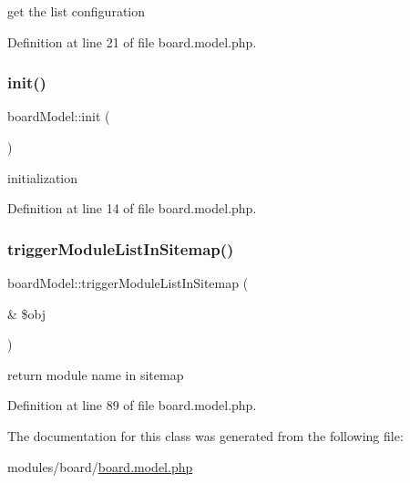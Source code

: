 get the list configuration 



Definition at line 21 of file board.\+model.\+php.

\hypertarget{classboardModel_a6195c2c2de16e5fee06e360aba66055a}{}\label{classboardModel_a6195c2c2de16e5fee06e360aba66055a} 
\subsubsection{\texorpdfstring{init()}{init()}}
{\footnotesize\ttfamily board\+Model\+::init (\begin{DoxyParamCaption}{ }\end{DoxyParamCaption})}



initialization 



Definition at line 14 of file board.\+model.\+php.

\hypertarget{classboardModel_a1960d5d832bbe3464065ec3c1ffce947}{}\label{classboardModel_a1960d5d832bbe3464065ec3c1ffce947} 
\subsubsection{\texorpdfstring{trigger\+Module\+List\+In\+Sitemap()}{triggerModuleListInSitemap()}}
{\footnotesize\ttfamily board\+Model\+::trigger\+Module\+List\+In\+Sitemap (\begin{DoxyParamCaption}\item[{\&}]{\$obj }\end{DoxyParamCaption})}



return module name in sitemap 



Definition at line 89 of file board.\+model.\+php.



The documentation for this class was generated from the following file\+:\begin{DoxyCompactItemize}
\item 
modules/board/\hyperlink{board_8model_8php}{board.\+model.\+php}\end{DoxyCompactItemize}
